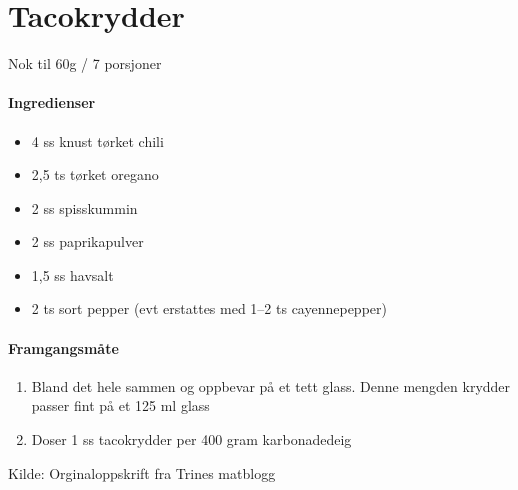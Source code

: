 \section{Tacokrydder}
\label{tacokrydder}

Nok til 60g / 7 porsjoner
\paragraph{Ingredienser}
\begin{itemize}[noitemsep]
	\item 4 ss knust tørket chili
	\item 2,5 ts tørket oregano
	\item 2 ss spisskummin
	\item 2 ss paprikapulver
	\item 1,5 ss havsalt
	\item 2 ts sort pepper (evt erstattes med 1--2 ts cayennepepper)
\end{itemize}

\paragraph{Framgangsmåte}
\begin{enumerate}[noitemsep]
	\item Bland det hele sammen og oppbevar på et tett glass. Denne mengden krydder passer fint på et 125 ml glass
	\item Doser 1 ss tacokrydder per 400 gram karbonadedeig
\end{enumerate}

Kilde: Orginaloppskrift fra Trines matblogg

%


